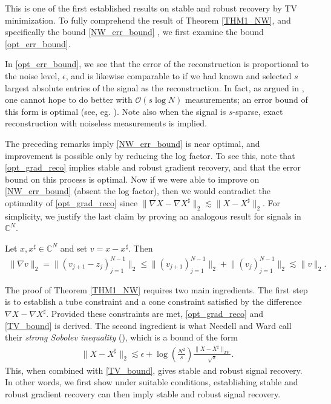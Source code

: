 \documentclass[11pt, oneside]{article}   %
\newcommand{\bC}{\mathbb{C}}
\renewcommand{\O}{\mathcal{O}}
\newcommand{\norm}[1]{\lVert #1 \rVert}
\begin{document}
This is one of the first established results on stable and robust recovery 
by TV minimization. To fully comprehend the result of Theorem \ref{THM1_NW}, and specifically the bound \eqref{NW_err_bound} , we first examine 
the bound \eqref{opt_err_bound}.

In \eqref{opt_err_bound}, we see that the error of the reconstruction is 
proportional to the noise level, $\epsilon$, and is likewise comparable to if we had known and selected $s$ largest absolute entries of the signal as the reconstruction. In fact, 
as argued in \cite{candes2006robust}, one cannot hope to do better with 
$\O(s\log N)$ measurements; an error bound of this form is optimal (see, 
eg. \cite[Chapters 4,11]{foucart2013mathematical}). Note also when the signal is $s$-sparse, exact reconstruction with noiseless measurements is implied.

The preceding remarks imply \eqref{NW_err_bound} is near optimal, and 
improvement is possible only by reducing the log factor. To see this, note that 
\eqref{opt_grad_reco} implies stable and robust gradient recovery, and that 
the error bound on this process is optimal. Now if we were able to improve on 
\eqref{NW_err_bound} (absent the log factor), then we would contradict the 
optimality of \eqref{opt_grad_reco} since $\norm{\nabla X - \nabla X^\sharp}_2 \lesssim 
\norm{X - X^\sharp}_2$. For simplicity, we justify the last claim by proving an analogous result for signals in $\bC^N$.

Let $x, x^\sharp \in \bC^N$ and set $v = x - x^\sharp$. Then 
\begin{align*}
        \norm{\nabla v}_2 
= \norm{(v_{j+1}-z_j)_{j=1}^{N-1}}_2 
\leq \norm{(v_{j+1})^{N-1}_{j=1}}_2 + \norm{(v_j)^{N-1}_{j=1}}_2 
\lesssim \norm{v}_2.
\end{align*}

The proof of Theorem \ref{THM1_NW}  requires two main ingredients.  The first step is to establish a tube constraint and a cone constraint satisfied by the difference 
$\nabla X - \nabla X^\sharp$. Provided these constraints are met, 
\eqref{opt_grad_reco} and \eqref{TV_bound} is derived. The second ingredient is what Needell and Ward call their \textit{strong Sobolev inequality} (\!\!\cite[Theorem 9]{needell2013stable}), which is a bound of the form 
\begin{align}
        \norm{X - X^\sharp}_2 
\lesssim \epsilon + \log\left(\frac{N^2}{s}\right) \frac{\norm{X - 
X^\sharp}_{TV}}{\sqrt{s}}.
\label{strong_sobolev} 
\end{align}
This, when combined with \eqref{TV_bound}, gives stable and robust signal 
recovery. In other words, we first show under suitable conditions, establishing stable and robust gradient recovery can then imply stable and robust signal recovery.
\end{document}
